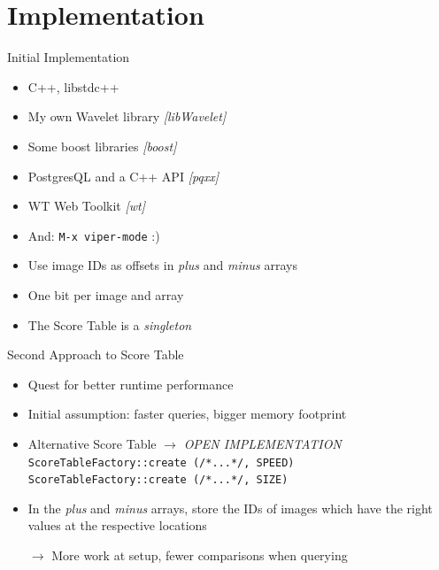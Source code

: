 \documentclass{beamer}
\newcommand\rarrow{$\longrightarrow$ } %
\begin{document}
\section{Implementation}

\begin{frame}{Initial Implementation}

  \begin{itemize}
  \item C++, libstdc++
  \item My own Wavelet library \emph{[libWavelet]}
  \item Some boost libraries \emph{[boost]}
  \item PostgresQL and a C++ API \emph{[pqxx]}
  \item WT Web Toolkit \emph{[wt]}
    \pause
  \item And: \texttt{M-x viper-mode} :)
  \end{itemize}

    \pause
  \begin{itemize}
  \item Use image IDs as offsets in \emph{plus} and \emph{minus} arrays
  \item One bit per image and array
  \item The Score Table is a \emph{singleton}
  \end{itemize}

\end{frame}

\begin{frame}{Second Approach to Score Table}

  \begin{itemize}
  \item Quest for better runtime performance
  \item Initial assumption: faster queries, bigger memory footprint
  \item Alternative Score Table \rarrow \emph{OPEN IMPLEMENTATION}\\
    \texttt{ScoreTableFactory::create (/*...*/, SPEED)}\\
    \texttt{ScoreTableFactory::create (/*...*/, SIZE)}\\
  \end{itemize}

  \pause
  \begin{itemize}
  \item In the \emph{plus} and \emph{minus} arrays, store the IDs of
    images which have the right values at the respective locations

    \rarrow More work at setup, fewer comparisons when querying
  \end{itemize}

\end{frame}
\end{document}
